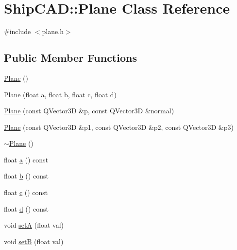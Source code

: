 \hypertarget{classShipCAD_1_1Plane}{\section{Ship\-C\-A\-D\-:\-:Plane Class Reference}
\label{classShipCAD_1_1Plane}
}


{\ttfamily \#include $<$plane.\-h$>$}

\subsection*{Public Member Functions}
\begin{DoxyCompactItemize}
\item 
\hyperlink{classShipCAD_1_1Plane_acac0d9c003e0ab10d07b146c3566a0c7}{Plane} ()
\item 
\hyperlink{classShipCAD_1_1Plane_a9a1420228e8baa632c7e8ba66f27772f}{Plane} (float \hyperlink{classShipCAD_1_1Plane_a1105f3715d9593c0971e0b0959859a84}{a}, float \hyperlink{classShipCAD_1_1Plane_adf79c9ba86dd3112fc098141195fcac5}{b}, float \hyperlink{classShipCAD_1_1Plane_a01b0067ca1a669aef5a8ab85bfce41cc}{c}, float \hyperlink{classShipCAD_1_1Plane_a7755d7967aae2e083c5d08fed49d9eef}{d})
\item 
\hyperlink{classShipCAD_1_1Plane_a254ddea0d760646007a19512e502e6fc}{Plane} (const Q\-Vector3\-D \&p, const Q\-Vector3\-D \&normal)
\item 
\hyperlink{classShipCAD_1_1Plane_adbaa1f5c7100e5592312359cb8eede37}{Plane} (const Q\-Vector3\-D \&p1, const Q\-Vector3\-D \&p2, const Q\-Vector3\-D \&p3)
\item 
\hyperlink{classShipCAD_1_1Plane_aff2204f8b2b25c201d172d4ec2518c77}{$\sim$\-Plane} ()
\item 
float \hyperlink{classShipCAD_1_1Plane_a1105f3715d9593c0971e0b0959859a84}{a} () const 
\item 
float \hyperlink{classShipCAD_1_1Plane_adf79c9ba86dd3112fc098141195fcac5}{b} () const 
\item 
float \hyperlink{classShipCAD_1_1Plane_a01b0067ca1a669aef5a8ab85bfce41cc}{c} () const 
\item 
float \hyperlink{classShipCAD_1_1Plane_a7755d7967aae2e083c5d08fed49d9eef}{d} () const 
\item 
void \hyperlink{classShipCAD_1_1Plane_a383a2f49031b8bcfa04be06035836a05}{set\-A} (float val)
\item 
void \hyperlink{classShipCAD_1_1Plane_aab7d46cba75a32089644b183e0a82dff}{set\-B} (float val)

\end{DoxyCompactItemize}

